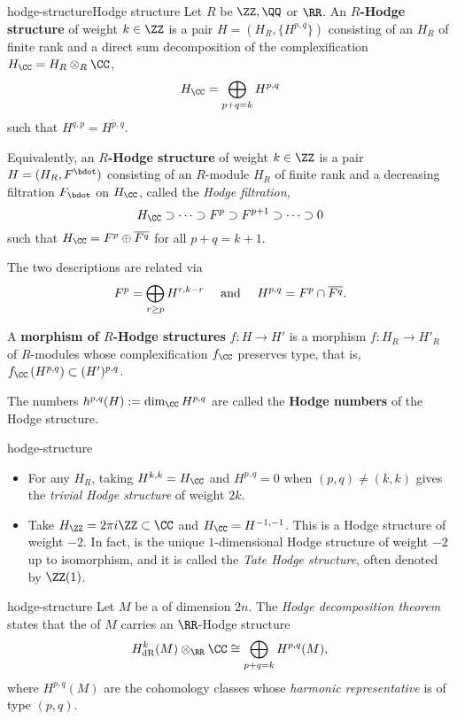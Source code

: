 \begin{topic}{hodge-structure}{Hodge structure}
    Let $R$ be $\ZZ, \QQ$ or $\RR$. An \textbf{$R$-Hodge structure} of weight $k \in \ZZ$ is a pair $H = (H_R, \{ H^{p, q} \})$ consisting of an  $H_R$ of finite rank and a direct sum decomposition of the complexification $H_\CC = H_R \otimes_R \CC$,
    \[ H_\CC = \bigoplus_{p + q = k} H^{p, q} \]
    such that $H^{q, p} = \overline{H^{p, q}}$.

    Equivalently, an \textbf{$R$-Hodge structure} of weight $k \in \ZZ$ is a pair $H = (H_R, F^\bdot)$ consisting of an $R$-module $H_R$ of finite rank and a decreasing filtration $F_\bdot$ on $H_\CC$, called the \textit{Hodge filtration},
    \[ H_\CC \supset \cdots \supset F^p \supset F^{p + 1} \supset \cdots \supset 0 \]
    such that $H_\CC = F^p \oplus \overline{F^q}$ for all $p + q = k + 1$.

    The two descriptions are related via
    \[ F^p = \bigoplus_{r \ge p} H^{r, k - r} \quad \textup{ and } \quad H^{p, q} = F^p \cap \overline{F^q} . \]

    A \textbf{morphism of $R$-Hodge structures} $f : H \to H'$ is a morphism $f : H_R \to H'_R$ of $R$-modules whose complexification $f_\CC$ preserves type, that is, $f_\CC\left(H^{p, q}\right) \subset (H')^{p, q}$.
    
    The numbers $h^{p, q}(H) := \dim_\CC H^{p, q}$ are called the \textbf{Hodge numbers} of the Hodge structure.
\end{topic}

\begin{example}{hodge-structure}
    \begin{itemize}
        \item For any $H_R$, taking $H^{k, k} = H_\CC$ and $H^{p, q} = 0$ when $(p, q) \ne (k, k)$ gives the \textit{trivial Hodge structure} of weight $2k$.
        \item Take $H_\ZZ = 2 \pi i \ZZ \subset \CC$ and $H_\CC = H^{-1, -1}$. This is a Hodge structure of weight $-2$. In fact, is the unique $1$-dimensional Hodge structure of weight $-2$ up to isomorphism, and it is called the \textit{Tate Hodge structure}, often denoted by $\ZZ(1)$.
    \end{itemize}
\end{example}

\begin{example}{hodge-structure}
    Let $M$ be a   of dimension $2n$. The \textit{Hodge decomposition theorem} states that the  of $M$ carries an $\RR$-Hodge structure
    \[ H_\textup{dR}^k(M) \otimes_\RR \CC \cong \bigoplus_{p + q = k} H^{p, q}(M) , \]
    where $H^{p, q}(M)$ are the cohomology classes whose \textit{harmonic representative} is of type $(p, q)$.
\end{example}

